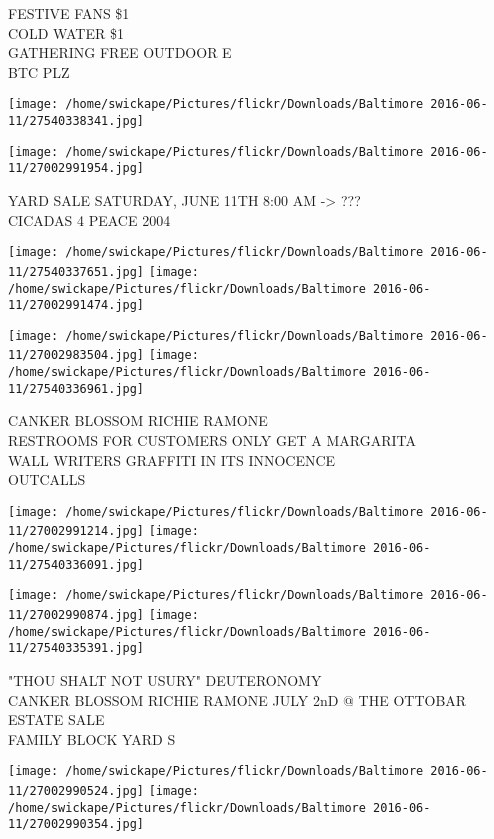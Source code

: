 \documentclass[10pt,letterpaper]{article}
\begin{document}
FESTIVE FANS \$1\\
COLD WATER \$1\\
GATHERING FREE OUTDOOR E\\
BTC PLZ\\
\pagebreak

\texttt{[image: /home/swickape/Pictures/flickr/Downloads/Baltimore 2016-06-11/27540338341.jpg]}

\vspace{0.25in}
\texttt{[image: /home/swickape/Pictures/flickr/Downloads/Baltimore 2016-06-11/27002991954.jpg]}

YARD SALE SATURDAY, JUNE 11TH 8:00 AM {-}> ???\\
CICADAS 4 PEACE 2004\\
\pagebreak

\texttt{[image: /home/swickape/Pictures/flickr/Downloads/Baltimore 2016-06-11/27540337651.jpg]}
\texttt{[image: /home/swickape/Pictures/flickr/Downloads/Baltimore 2016-06-11/27002991474.jpg]}

\texttt{[image: /home/swickape/Pictures/flickr/Downloads/Baltimore 2016-06-11/27002983504.jpg]}
\texttt{[image: /home/swickape/Pictures/flickr/Downloads/Baltimore 2016-06-11/27540336961.jpg]}

CANKER BLOSSOM RICHIE RAMONE\\
RESTROOMS FOR CUSTOMERS ONLY GET A MARGARITA\\
WALL WRITERS GRAFFITI IN ITS INNOCENCE\\
OUTCALLS\\
\pagebreak

\texttt{[image: /home/swickape/Pictures/flickr/Downloads/Baltimore 2016-06-11/27002991214.jpg]}
\texttt{[image: /home/swickape/Pictures/flickr/Downloads/Baltimore 2016-06-11/27540336091.jpg]}

\texttt{[image: /home/swickape/Pictures/flickr/Downloads/Baltimore 2016-06-11/27002990874.jpg]}
\texttt{[image: /home/swickape/Pictures/flickr/Downloads/Baltimore 2016-06-11/27540335391.jpg]}

"THOU SHALT NOT USURY" DEUTERONOMY\\
CANKER BLOSSOM RICHIE RAMONE JULY 2nD @ THE OTTOBAR\\
ESTATE SALE\\
FAMILY BLOCK YARD S\\
\pagebreak

\texttt{[image: /home/swickape/Pictures/flickr/Downloads/Baltimore 2016-06-11/27002990524.jpg]}
\texttt{[image: /home/swickape/Pictures/flickr/Downloads/Baltimore 2016-06-11/27002990354.jpg]}
\end{document}
